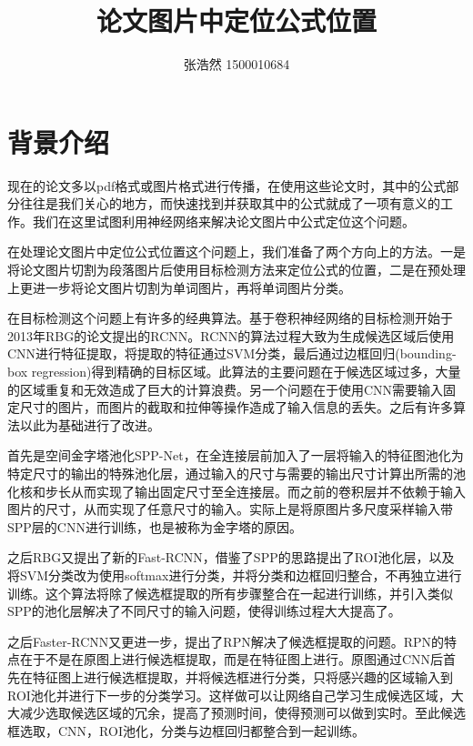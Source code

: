\documentclass[12pt]{article}
\title{论文图片中定位公式位置}
\author{张浩然 1500010684}
\date{}
\begin{document}


\maketitle
\tableofcontents

\abstract{}

\newpage

\section{背景介绍}
\noindent

现在的论文多以pdf格式或图片格式进行传播，在使用这些论文时，其中的公式部分往往是我们关心的地方，而快速找到并获取其中的公式就成了一项有意义的工作。我们在这里试图利用神经网络来解决论文图片中公式定位这个问题。

在处理论文图片中定位公式位置这个问题上，我们准备了两个方向上的方法。一是将论文图片切割为段落图片后使用目标检测方法来定位公式的位置，二是在预处理上更进一步将论文图片切割为单词图片，再将单词图片分类。

在目标检测这个问题上有许多的经典算法。基于卷积神经网络的目标检测开始于2013年RBG的论文\cite{rcnn}提出的RCNN。RCNN的算法过程大致为生成候选区域后使用CNN进行特征提取，将提取的特征通过SVM分类，最后通过边框回归(bounding-box regression)得到精确的目标区域。此算法的主要问题在于候选区域过多，大量的区域重复和无效造成了巨大的计算浪费。另一个问题在于使用CNN需要输入固定尺寸的图片，而图片的截取和拉伸等操作造成了输入信息的丢失。之后有许多算法以此为基础进行了改进。

首先是空间金字塔池化SPP-Net\cite{spp}，在全连接层前加入了一层将输入的特征图池化为特定尺寸的输出的特殊池化层，通过输入的尺寸与需要的输出尺寸计算出所需的池化核和步长从而实现了输出固定尺寸至全连接层。而之前的卷积层并不依赖于输入图片的尺寸，从而实现了任意尺寸的输入。实际上是将原图片多尺度采样输入带SPP层的CNN进行训练，也是被称为金字塔的原因。

之后RBG又提出了新的Fast-RCNN\cite{frcnn}，借鉴了SPP的思路提出了ROI池化层，以及将SVM分类改为使用softmax进行分类，并将分类和边框回归整合，不再独立进行训练。这个算法将除了候选框提取的所有步骤整合在一起进行训练，并引入类似SPP的池化层解决了不同尺寸的输入问题，使得训练过程大大提高了。

之后Faster-RCNN\cite{ftrcnn}又更进一步，提出了RPN解决了候选框提取的问题。RPN的特点在于不是在原图上进行候选框提取，而是在特征图上进行。原图通过CNN后首先在特征图上进行候选框提取，并将候选框进行分类，只将感兴趣的区域输入到ROI池化并进行下一步的分类学习。这样做可以让网络自己学习生成候选区域，大大减少选取候选区域的冗余，提高了预测时间，使得预测可以做到实时。至此候选框选取，CNN，ROI池化，分类与边框回归都整合到一起训练。
\end{document}
